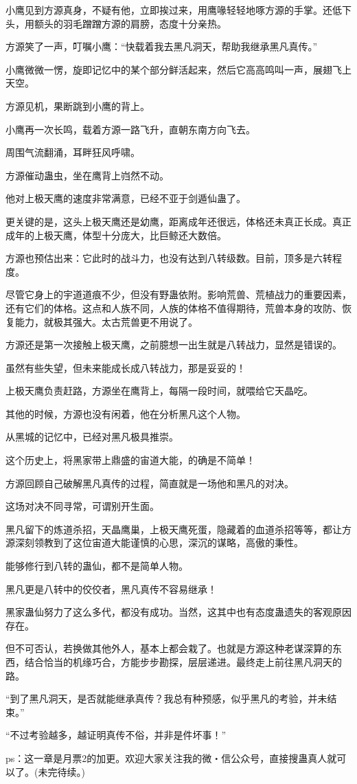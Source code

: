 \begin{this_body}
小鹰见到方源真身，不疑有他，立即挨过来，用鹰喙轻轻地啄方源的手掌。还低下头，用额头的羽毛蹭蹭方源的肩膀，态度十分亲热。

方源笑了一声，叮嘱小鹰：“快载着我去黑凡洞天，帮助我继承黑凡真传。”

小鹰微微一愣，旋即记忆中的某个部分鲜活起来，然后它高高鸣叫一声，展翅飞上天空。

方源见机，果断跳到小鹰的背上。

小鹰再一次长鸣，载着方源一路飞升，直朝东南方向飞去。

周围气流翻涌，耳畔狂风呼啸。

方源催动蛊虫，坐在鹰背上岿然不动。

他对上极天鹰的速度非常满意，已经不亚于剑遁仙蛊了。

更关键的是，这头上极天鹰还是幼鹰，距离成年还很远，体格还未真正长成。真正成年的上极天鹰，体型十分庞大，比巨鲸还大数倍。

方源也预估出来：它此时的战斗力，也没有达到八转级数。目前，顶多是六转程度。

尽管它身上的宇道道痕不少，但没有野蛊依附。影响荒兽、荒植战力的重要因素，还有它们的体格。这点和人族不同，人族的体格不值得期待，荒兽本身的攻防、恢复能力，就极其强大。太古荒兽更不用说了。

方源还是第一次接触上极天鹰，之前臆想一出生就是八转战力，显然是错误的。

虽然有些失望，但未来能成长成八转战力，那是妥妥的！

上极天鹰负责赶路，方源坐在鹰背上，每隔一段时间，就喂给它天晶吃。

其他的时候，方源也没有闲着，他在分析黑凡这个人物。

从黑城的记忆中，已经对黑凡极具推崇。

这个历史上，将黑家带上鼎盛的宙道大能，的确是不简单！

方源回顾自己破解黑凡真传的过程，简直就是一场他和黑凡的对决。

这场对决不同寻常，可谓别开生面。

黑凡留下的炼道杀招，天晶鹰巢，上极天鹰死蛋，隐藏着的血道杀招等等，都让方源深刻领教到了这位宙道大能谨慎的心思，深沉的谋略，高傲的秉性。

能够修行到八转的蛊仙，都不是简单人物。

黑凡更是八转中的佼佼者，黑凡真传不容易继承！

黑家蛊仙努力了这么多代，都没有成功。当然，这其中也有态度蛊遗失的客观原因存在。

但不可否认，若换做其他外人，基本上都会栽了。也就是方源这种老谋深算的东西，结合恰当的机缘巧合，方能步步勘探，层层递进。最终走上前往黑凡洞天的路。

“到了黑凡洞天，是否就能继承真传？我总有种预感，似乎黑凡的考验，并未结束。”

“不过考验越多，越证明真传不俗，并非是件坏事！”

ps：这一章是月票2的加更。欢迎大家关注我的微・信公众号，直接搜蛊真人就可以了。(未完待续。)

\end{this_body}

